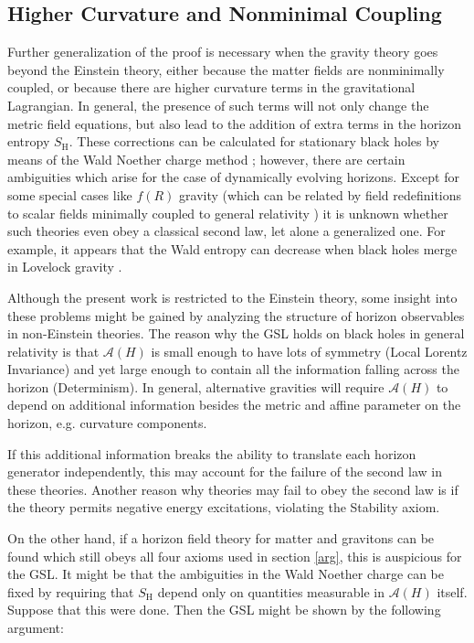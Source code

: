\documentclass{article}
\begin{document}
\subsection{Higher Curvature and Nonminimal Coupling}\label{nonmin}

Further generalization of the proof is necessary when the gravity theory goes beyond the Einstein theory, either because the matter fields are nonminimally coupled, or because there are higher curvature terms in the gravitational Lagrangian.  In general, the presence of such terms will not only change the metric field equations, but also lead to the addition of extra terms in the horizon entropy $S_\mathrm{H}$.  These corrections can be calculated for stationary black holes by means of the Wald Noether charge method \cite{WI94}; however, there are certain ambiguities which arise for the case of dynamically evolving horizons.  Except for some special cases like $f(R)$ gravity (which can be related by field redefinitions to scalar fields minimally coupled to general relativity \cite{2ndlaw}) it is unknown whether such theories even obey a classical second law, let alone a generalized one.  For example, it appears that the Wald entropy can decrease when black holes merge in Lovelock gravity \cite{lovelock}.

Although the present work is restricted to the Einstein theory, some insight into these problems might be gained by analyzing the structure of horizon observables in non-Einstein theories.  The reason why the GSL holds on black holes in general relativity is that $\mathcal{A}(H)$ is small enough to have lots of symmetry (Local Lorentz Invariance) and yet large enough to contain all the information falling across the horizon (Determinism).  In general, alternative gravities will require $\mathcal{A}(H)$ to depend on additional information besides the metric and affine parameter on the horizon, e.g. curvature components.

If this additional information breaks the ability to translate each horizon generator independently, this may account for the failure of the second law in these theories.  Another reason why theories may fail to obey the second law is if the theory permits negative energy excitations, violating the Stability axiom.

On the other hand, if a horizon field theory for matter and gravitons can be found which still obeys all four axioms used in section \ref{arg}, this is auspicious for the GSL.  It might be that the ambiguities in the Wald Noether charge can be fixed by requiring that $S_\mathrm{H}$ depend only on quantities measurable in $\mathcal{A}(H)$ itself.  Suppose that this were done.  Then the GSL might be shown by the following argument:
\end{document}
